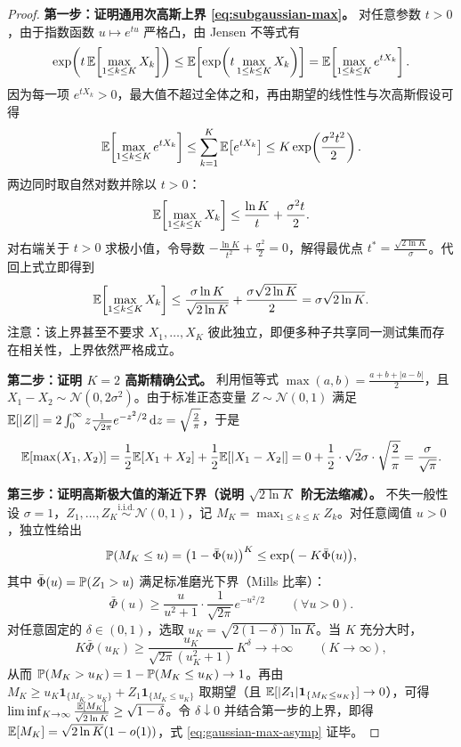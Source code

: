 \begin{proof}
\textbf{第一步：证明通用次高斯上界 \eqref{eq:subgaussian-max}。}
对任意参数 $t > 0$，由于指数函数 $u \mapsto e^{tu}$ 严格凸，由 Jensen 不等式有
\[
  \exp\!\left(t\,\mathbb{E}\!\left[\max_{1\le k\le K} X_k\right]\right)
  \le \mathbb{E}\!\left[\exp\!\left(t \max_{1\le k\le K} X_k\right)\right]
  = \mathbb{E}\!\left[\max_{1\le k\le K} e^{t X_k}\right].
\]
因为每一项 $e^{t X_k} > 0$，最大值不超过全体之和，再由期望的线性性与次高斯假设可得
\[
  \mathbb{E}\!\left[\max_{1\le k\le K} e^{t X_k}\right]
  \le \sum_{k=1}^K \mathbb{E}\!\left[e^{t X_k}\right]
  \le K \exp\!\left(\frac{\sigma^2 t^2}{2}\right).
\]
两边同时取自然对数并除以 $t > 0$：
\[
  \mathbb{E}\!\left[\max_{1\le k\le K} X_k\right] \le \frac{\ln K}{t} + \frac{\sigma^2 t}{2}.
\]
对右端关于 $t > 0$ 求极小值，令导数 $-\frac{\ln K}{t^2} + \frac{\sigma^2}{2} = 0$，解得最优点 $t^* = \frac{\sqrt{2\ln K}}{\sigma}$。代回上式立即得到
\[
  \mathbb{E}\!\left[\max_{1\le k\le K} X_k\right] \le \frac{\sigma\ln K}{\sqrt{2\ln K}} + \frac{\sigma\sqrt{2\ln K}}{2} = \sigma\sqrt{2\ln K}.
\]
注意：该上界甚至不要求 $X_1,\dots,X_K$ 彼此独立，即便多种子共享同一测试集而存在相关性，上界依然严格成立。

\textbf{第二步：证明 $K=2$ 高斯精确公式。}
利用恒等式 $\max(a,b) = \frac{a+b+|a-b|}{2}$，且 $X_1 - X_2 \sim \mathcal{N}(0, 2\sigma^2)$。由于标准正态变量 $Z \sim \mathcal{N}(0,1)$ 满足 $\mathbb{E}[|Z|] = 2\int_0^\infty z\frac{1}{\sqrt{2\pi}}e^{-z^2/2}\,\mathrm{d}z = \sqrt{\frac{2}{\pi}}$，于是
\[
  \mathbb{E}[\max(X_1, X_2)] = \frac{1}{2}\mathbb{E}[X_1+X_2] + \frac{1}{2}\mathbb{E}[|X_1-X_2|]
  = 0 + \frac{1}{2}\cdot\sqrt{2}\sigma\cdot\sqrt{\frac{2}{\pi}} = \frac{\sigma}{\sqrt{\pi}}.
\]

\textbf{第三步：证明高斯极大值的渐近下界（说明 $\sqrt{2\ln K}$ 阶无法缩减）。}
不失一般性设 $\sigma = 1$，$Z_1,\dots,Z_K \stackrel{\text{i.i.d.}}{\sim} \mathcal{N}(0,1)$，记 $M_K = \max_{1\le k\le K} Z_k$。对任意阈值 $u > 0$，独立性给出
\[
  \mathbb{P}(M_K \le u) = \big(1 - \bar{\Phi}(u)\big)^K \le \exp\!\big(-K\bar{\Phi}(u)\big),
\]
其中 $\bar{\Phi}(u) = \mathbb{P}(Z_1 > u)$ 满足标准磨光下界（Mills 比率）：
\[
  \bar{\Phi}(u) \ge \frac{u}{u^2+1}\cdot\frac{1}{\sqrt{2\pi}} e^{-u^2/2} \qquad (\forall u > 0).
\]
对任意固定的 $\delta \in (0,1)$，选取 $u_K = \sqrt{2(1-\delta)\ln K}$。当 $K$ 充分大时，
\[
  K\bar{\Phi}(u_K) \ge \frac{u_K}{\sqrt{2\pi}(u_K^2+1)}\, K^{\delta} \longrightarrow +\infty \qquad (K \to \infty),
\]
从而 $\mathbb{P}(M_K > u_K) = 1 - \mathbb{P}(M_K \le u_K) \to 1$。再由 $M_K \ge u_K \mathbf{1}_{\{M_K > u_K\}} + Z_1 \mathbf{1}_{\{M_K \le u_K\}}$ 取期望（且 $\mathbb{E}[|Z_1|\mathbf{1}_{\{M_K\le u_K\}}] \to 0$），可得 $\liminf_{K\to\infty}\frac{\mathbb{E}[M_K]}{\sqrt{2\ln K}} \ge \sqrt{1-\delta}$。令 $\delta \downarrow 0$ 并结合第一步的上界，即得 $\mathbb{E}[M_K] = \sqrt{2\ln K}(1-o(1))$，式 \eqref{eq:gaussian-max-asymp} 证毕。
\end{proof}

